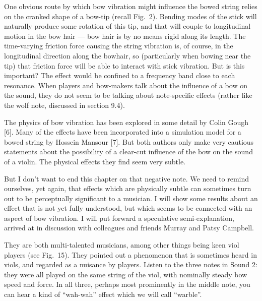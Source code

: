   One obvious route by which bow vibration might influence the bowed string 
  relies on the cranked shape of a bow-tip (recall Fig.\ 2). Bending modes of 
  the stick will naturally produce some rotation of this tip, and that will 
  couple to longitudinal motion in the bow hair — bow hair is by no means rigid 
  along its length. The time-varying friction force causing the string 
  vibration is, of course, in the longitudinal direction along the bowhair, so 
  (particularly when bowing near the tip) that friction force will be able to 
  interact with stick vibration. But is this important? The effect would be 
  confined to a frequency band close to each resonance. When players and 
  bow-makers talk about the influence of a bow on the sound, they do not seem 
  to be talking about note-specific effects (rather like the wolf note, 
  discussed in section 9.4). 

  The physics of bow vibration has been explored in some detail by Colin Gough 
  [6]. Many of the effects have been incorporated into a simulation model for a 
  bowed string by Hossein Mansour [7]. But both authors only make very cautious 
  statements about the possibility of a clear-cut influence of the bow on the 
  sound of a violin. The physical effects they find seem very subtle. 

  But I don’t want to end this chapter on that negative note. We need to remind 
  ourselves, yet again, that effects which are physically subtle can sometimes 
  turn out to be perceptually significant to a musician. I will show some 
  results about an effect that is not yet fully understood, but which seems to 
  be connected with an aspect of bow vibration. I will put forward a 
  speculative semi-explanation, arrived at in discussion with colleagues and 
  friends Murray and Patsy Campbell. 


  They are both multi-talented musicians, among other things being keen viol 
  players (see Fig.\ 15). They pointed out a phenomenon that is sometimes heard 
  in viols, and regarded as a nuisance by players. Listen to the three notes in 
  Sound 2: they were all played on the same string of the viol, with nominally 
  steady bow speed and force. In all three, perhaps most prominently in the 
  middle note, you can hear a kind of “wah-wah” effect which we will call 
  “warble”. 

